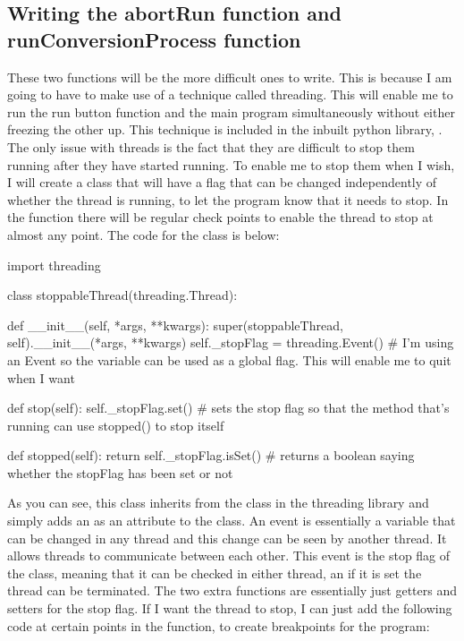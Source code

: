 \documentclass{report}
\begin{document}
\subsection{Writing the abortRun function and runConversionProcess function}
These two functions will be the more difficult ones to write. This is because I am going to have to make use of a technique called threading. This will enable me to run the run button function and the main program simultaneously without either freezing the other up. This technique is included in the inbuilt python library, . The only issue with threads is the fact that they are difficult to stop them running after they have started running. To enable me to stop them when I wish, I will create a  class that will have a flag that can be changed independently of whether the thread is running, to let the program know that it needs to stop. In the  function there will be regular check points to enable the thread to stop at almost any point. The code for the  class is below:
\begin{python}
import threading

class stoppableThread(threading.Thread):

    def __init__(self, *args, **kwargs):
        super(stoppableThread, self).__init__(*args, **kwargs)
        self._stopFlag = threading.Event()  # I'm using an Event so the variable can be used as a global flag. This will enable me to quit when I want

    def stop(self):
        self._stopFlag.set()  # sets the stop flag so that the method that's running can use stopped() to stop itself

    def stopped(self):
        return self._stopFlag.isSet()  # returns a boolean saying whether the stopFlag has been set or not
\end{python}
As you can see, this class inherits from the  class in the threading library and simply adds an  as an attribute to the class. An event is essentially a variable that can be changed in any thread and this change can be seen by another thread. It allows threads to communicate between each other. This event is the stop flag of the class, meaning that it can be checked in either thread, an if it is set the thread can be terminated. The two extra functions are essentially just getters and setters for the stop flag. If I want the thread to stop, I can just add the following code at certain points in the  function, to create breakpoints for the program:
\end{document}
